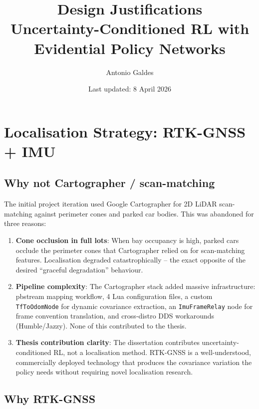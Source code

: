 \documentclass[11pt,a4paper]{article}
\title{Design Justifications\\
\large Uncertainty-Conditioned RL with Evidential Policy Networks}
\author{Antonio Galdes}
\date{Last updated: 8 April 2026}
\begin{document}
\maketitle

\section{Localisation Strategy: RTK-GNSS + IMU}

\subsection{Why not Cartographer / scan-matching}

The initial project iteration used Google Cartographer for 2D LiDAR
scan-matching against perimeter cones and parked car bodies. This was
abandoned for three reasons:

\begin{enumerate}
  \item \textbf{Cone occlusion in full lots}: When bay occupancy is high,
        parked cars occlude the perimeter cones that Cartographer relied on
        for scan-matching features. Localisation degraded catastrophically --
        the exact opposite of the desired ``graceful degradation'' behaviour.
  \item \textbf{Pipeline complexity}: The Cartographer stack added massive
        infrastructure: pbstream mapping workflow, 4 Lua configuration files,
        a custom \texttt{TfToOdomNode} for dynamic covariance extraction, an
        \texttt{ImuFrameRelay} node for frame convention translation, and
        cross-distro DDS workarounds (Humble/Jazzy). None of this contributed
        to the thesis.
  \item \textbf{Thesis contribution clarity}: The dissertation contributes
        uncertainty-conditioned RL, not a localisation method. RTK-GNSS is a
        well-understood, commercially deployed technology that produces the
        covariance variation the policy needs without requiring novel
        localisation research.
\end{enumerate}

\subsection{Why RTK-GNSS}
\end{document}
